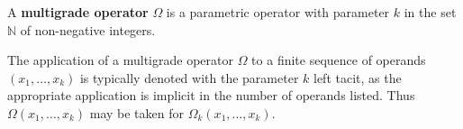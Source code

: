\documentclass[12pt]{article}
\begin{document}
A \textbf{multigrade operator} $\Omega$ is a parametric operator with parameter $k$ in the set $\mathbb{N}$ of non-negative integers.

The application of a multigrade operator $\Omega$ to a finite sequence of operands $(x_1, \ldots, x_k)$ is typically denoted with the parameter $k$ left tacit, as the appropriate application is implicit in the number of operands listed.  Thus $\Omega(x_1, \ldots, x_k)$ may be taken for $\Omega_k(x_1, \ldots, x_k).$

\end{document}
